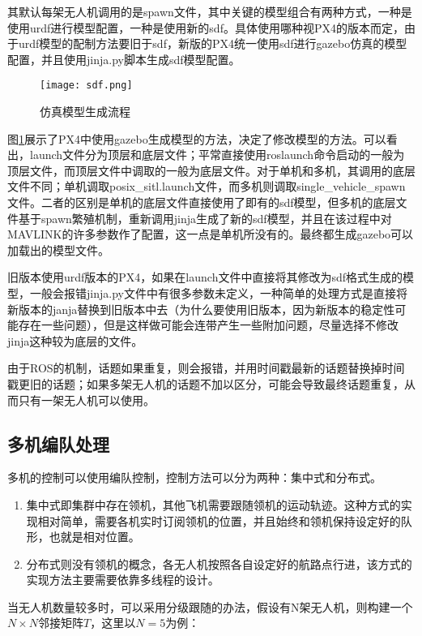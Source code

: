 其默认每架无人机调用的是spawn文件，其中关键的模型组合有两种方式，一种是使用urdf进行模型配置，一种是使用新的sdf。具体使用哪种视PX4的版本而定，由于urdf模型的配制方法要旧于sdf，新版的PX4统一使用sdf进行gazebo仿真的模型配置，并且使用jinja.py脚本生成sdf模型配置。

\begin{figure}[!ht]
	\centering
	\texttt{[image: sdf.png]}
	\caption{仿真模型生成流程}
	\label{fig-sdf}
\end{figure}

图\ref{fig-sdf}展示了PX4中使用gazebo生成模型的方法，决定了修改模型的方法。可以看出，launch文件分为顶层和底层文件；平常直接使用roslaunch命令启动的一般为顶层文件，而顶层文件中调取的一般为底层文件。对于单机和多机，其调用的底层文件不同；单机调取posix\_sitl.launch文件，而多机则调取single\_vehicle\_spawn文件。二者的区别是单机的底层文件直接使用了即有的sdf模型，但多机的底层文件基于spawn繁殖机制，重新调用jinja生成了新的sdf模型，并且在该过程中对MAVLINK的许多参数作了配置，这一点是单机所没有的。最终都生成gazebo可以加载出的模型文件。

旧版本使用urdf版本的PX4，如果在launch文件中直接将其修改为sdf格式生成的模型，一般会报错jinja.py文件中有很多参数未定义，一种简单的处理方式是直接将新版本的janja替换到旧版本中去（为什么要使用旧版本，因为新版本的稳定性可能存在一些问题），但是这样做可能会连带产生一些附加问题，尽量选择不修改jinja这种较为底层的文件。

由于ROS的机制，话题如果重复，则会报错，并用时间戳最新的话题替换掉时间戳更旧的话题；如果多架无人机的话题不加以区分，可能会导致最终话题重复，从而只有一架无人机可以使用。


\subsection{多机编队处理} \label{4.3.2}

多机的控制可以使用编队控制，控制方法可以分为两种：集中式和分布式。

\begin{enumerate}
	\item 集中式即集群中存在领机，其他飞机需要跟随领机的运动轨迹。这种方式的实现相对简单，需要各机实时订阅领机的位置，并且始终和领机保持设定好的队形，也就是相对位置。
	\item 分布式则没有领机的概念，各无人机按照各自设定好的航路点行进，该方式的实现方法主要需要依靠多线程的设计。
\end{enumerate}

当无人机数量较多时，可以采用分级跟随的办法，假设有N架无人机，则构建一个$N \times N$邻接矩阵$T$，这里以$N=5$为例：

